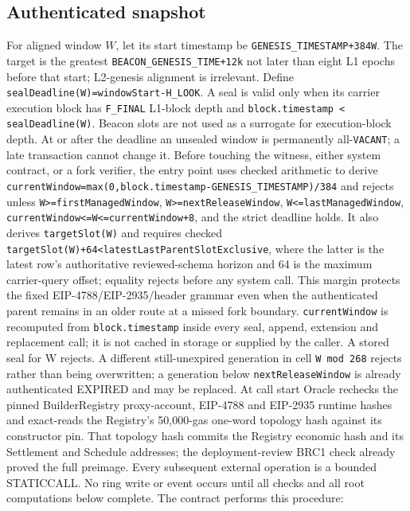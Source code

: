 \documentclass[a4paper,11pt]{article}
\newcommand{\code}[1]{\nolinkurl{#1}}
\begin{document}
\subsection{Authenticated snapshot}

For aligned window $W$, let its start timestamp be
\code{GENESIS_TIMESTAMP+384W}.  The target is the greatest
\code{BEACON_GENESIS_TIME+12k} not later than eight L1 epochs before that
start; L2-genesis alignment is irrelevant.  Define
\code{sealDeadline(W)=windowStart-H_LOOK}.  A seal is valid only when its carrier
execution block has \code{F_FINAL} L1-block depth and
\code{block.timestamp < sealDeadline(W)}.  Beacon slots are not used as a
surrogate for execution-block depth.  At or after the deadline an unsealed
window is permanently all-\code{VACANT}; a late transaction cannot change it.
Before touching the witness, either system contract, or a fork verifier, the
entry point uses checked arithmetic to derive
\code{currentWindow=max(0,block.timestamp-GENESIS_TIMESTAMP)/384} and rejects
unless
\code{W>=firstManagedWindow}, \code{W>=nextReleaseWindow},
\code{W<=lastManagedWindow},
\code{currentWindow<=W<=currentWindow+8}, and the strict
deadline holds.  It also derives \code{targetSlot(W)} and requires checked
\code{targetSlot(W)+64<latestLastParentSlotExclusive}, where the latter is the
latest row's authoritative reviewed-schema horizon and 64 is the maximum
carrier-query offset; equality rejects before any system call.  This margin
protects the fixed EIP-4788/EIP-2935/header grammar even when the authenticated
parent remains in an older route at a missed fork boundary.
\code{currentWindow} is recomputed from \code{block.timestamp} inside every
seal, append, extension and replacement call; it is not cached in storage or
supplied by the caller.  A stored seal for W rejects.  A different
still-unexpired generation in cell
\code{W mod 268} rejects rather than being overwritten; a generation below
\code{nextReleaseWindow} is already authenticated EXPIRED and may be replaced.
At call start Oracle rechecks the pinned BuilderRegistry proxy-account,
EIP-4788 and EIP-2935 runtime hashes and exact-reads the Registry's 50,000-gas
one-word topology hash against its constructor pin.  That topology hash
commits the Registry economic hash and its Settlement and Schedule addresses;
the deployment-review BRC1 check already proved the full preimage.  Every
subsequent
external operation is a bounded STATICCALL.  No ring write or event occurs
until all checks and all root computations below complete.
The contract performs this procedure:
\end{document}
